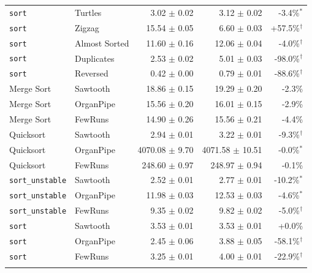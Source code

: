 \begin{tabular*}{\textwidth}{@{\extracolsep\fill}llrrr@{\extracolsep\fill}}
\texttt{sort} & Turtles & 3.02 $\pm$ 0.02 & 3.12 $\pm$ 0.02 & -3.4\%$^{*}$ \\
\texttt{sort} & Zigzag & 15.54 $\pm$ 0.05 & 6.60 $\pm$ 0.03 & +57.5\%$^{\dagger}$ \\
\texttt{sort} & Almost Sorted & 11.60 $\pm$ 0.16 & 12.06 $\pm$ 0.04 & -4.0\%$^{\dagger}$ \\
\texttt{sort} & Duplicates & 2.53 $\pm$ 0.02 & 5.01 $\pm$ 0.03 & -98.0\%$^{\dagger}$ \\
\texttt{sort} & Reversed & 0.42 $\pm$ 0.00 & 0.79 $\pm$ 0.01 & -88.6\%$^{\dagger}$ \\
\midrule
Merge Sort & Sawtooth & 18.86 $\pm$ 0.15 & 19.29 $\pm$ 0.20 & -2.3\% \\
Merge Sort & OrganPipe & 15.56 $\pm$ 0.20 & 16.01 $\pm$ 0.15 & -2.9\% \\
Merge Sort & FewRuns & 14.90 $\pm$ 0.26 & 15.56 $\pm$ 0.21 & -4.4\% \\
Quicksort & Sawtooth & 2.94 $\pm$ 0.01 & 3.22 $\pm$ 0.01 & -9.3\%$^{\dagger}$ \\
Quicksort & OrganPipe & 4070.08 $\pm$ 9.70 & 4071.58 $\pm$ 10.51 & -0.0\%$^{*}$ \\
Quicksort & FewRuns & 248.60 $\pm$ 0.97 & 248.97 $\pm$ 0.94 & -0.1\% \\
\texttt{sort\_unstable} & Sawtooth & 2.52 $\pm$ 0.01 & 2.77 $\pm$ 0.01 & -10.2\%$^{*}$ \\
\texttt{sort\_unstable} & OrganPipe & 11.98 $\pm$ 0.03 & 12.53 $\pm$ 0.03 & -4.6\%$^{*}$ \\
\texttt{sort\_unstable} & FewRuns & 9.35 $\pm$ 0.02 & 9.82 $\pm$ 0.02 & -5.0\%$^{\dagger}$ \\
\texttt{sort} & Sawtooth & 3.53 $\pm$ 0.01 & 3.53 $\pm$ 0.01 & +0.0\% \\
\texttt{sort} & OrganPipe & 2.45 $\pm$ 0.06 & 3.88 $\pm$ 0.05 & -58.1\%$^{\dagger}$ \\
\texttt{sort} & FewRuns & 3.25 $\pm$ 0.01 & 4.00 $\pm$ 0.01 & -22.9\%$^{\dagger}$ \\
\botrule
\end{tabular*}
